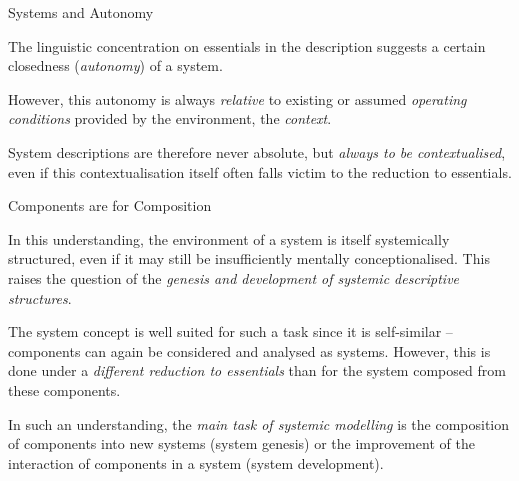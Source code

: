 \documentclass{beamer}
\begin{document}
\begin{frame}{Systems and Autonomy}

The linguistic concentration on essentials in the description suggests a
certain closedness (\emph{autonomy}) of a system.
  
However, this autonomy is always \emph{relative} to existing or assumed
\emph{operating conditions} provided by the environment, the \emph{context}.

System descriptions are therefore never absolute, but \emph{always to be
  contextualised}, even if this contextualisation itself often falls victim to
the reduction to essentials.

\end{frame}

\begin{frame}{Components are for Composition}

In this understanding, the environment of a system is itself systemically
structured, even if it may still be insufficiently mentally conceptionalised.
This raises the question of the \emph{genesis and development of systemic
  descriptive structures}.

The system concept is well suited for such a task since it is self-similar --
components can again be considered and analysed as systems.  However, this is
done under a \emph{different reduction to essentials} than for the system
composed from these components.

In such an understanding, the \emph{main task of systemic modelling} is the
composition of components into new systems (system genesis) or the improvement
of the interaction of components in a system (system development).

\end{frame}

\end{document}

